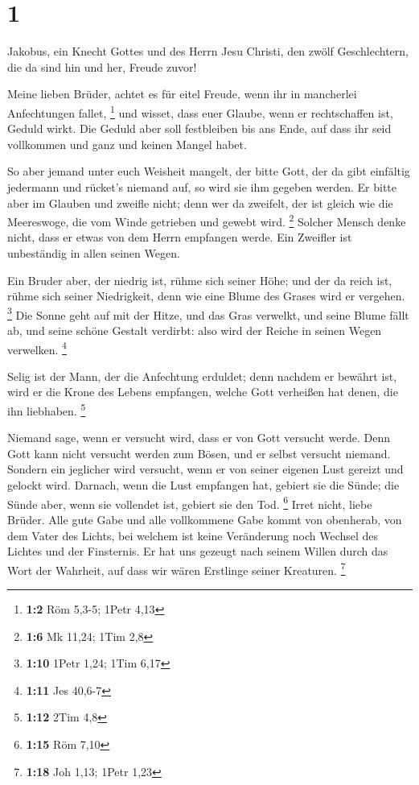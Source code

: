 \hypertarget{section}{%
\section{1}\label{section}}

 Jakobus, ein Knecht Gottes und des Herrn Jesu Christi, den
zwölf Geschlechtern, die da sind hin und her, Freude zuvor!

 Meine lieben Brüder, achtet es für eitel Freude, wenn ihr
in mancherlei Anfechtungen fallet, \footnote{\textbf{1:2} Röm 5,3-5;
  1Petr 4,13}  und wisset, dass euer Glaube, wenn er
rechtschaffen ist, Geduld wirkt.  Die Geduld aber soll
festbleiben bis ans Ende, auf dass ihr seid vollkommen und ganz und
keinen Mangel habet.

 So aber jemand unter euch Weisheit mangelt, der bitte Gott,
der da gibt einfältig jedermann und rücket's niemand auf, so wird sie
ihm gegeben werden.  Er bitte aber im Glauben und zweifle
nicht; denn wer da zweifelt, der ist gleich wie die Meereswoge, die vom
Winde getrieben und gewebt wird. \footnote{\textbf{1:6} Mk 11,24; 1Tim
  2,8}  Solcher Mensch denke nicht, dass er etwas von dem
Herrn empfangen werde.  Ein Zweifler ist unbeständig in
allen seinen Wegen.

 Ein Bruder aber, der niedrig ist, rühme sich seiner Höhe;
 und der da reich ist, rühme sich seiner Niedrigkeit, denn
wie eine Blume des Grases wird er vergehen. \footnote{\textbf{1:10}
  1Petr 1,24; 1Tim 6,17}  Die Sonne geht auf mit der Hitze,
und das Gras verwelkt, und seine Blume fällt ab, und seine schöne
Gestalt verdirbt: also wird der Reiche in seinen Wegen verwelken.
\footnote{\textbf{1:11} Jes 40,6-7}

 Selig ist der Mann, der die Anfechtung erduldet; denn
nachdem er bewährt ist, wird er die Krone des Lebens empfangen, welche
Gott verheißen hat denen, die ihn liebhaben. \footnote{\textbf{1:12}
  2Tim 4,8}

 Niemand sage, wenn er versucht wird, dass er von Gott
versucht werde. Denn Gott kann nicht versucht werden zum Bösen, und er
selbst versucht niemand.  Sondern ein jeglicher wird
versucht, wenn er von seiner eigenen Lust gereizt und gelockt wird.
 Darnach, wenn die Lust empfangen hat, gebiert sie die
Sünde; die Sünde aber, wenn sie vollendet ist, gebiert sie den Tod.
\footnote{\textbf{1:15} Röm 7,10}  Irret nicht, liebe
Brüder.  Alle gute Gabe und alle vollkommene Gabe kommt von
obenherab, von dem Vater des Lichts, bei welchem ist keine Veränderung
noch Wechsel des Lichtes und der Finsternis.  Er hat uns
gezeugt nach seinem Willen durch das Wort der Wahrheit, auf dass wir
wären Erstlinge seiner Kreaturen. \footnote{\textbf{1:18} Joh 1,13;
  1Petr 1,23}

